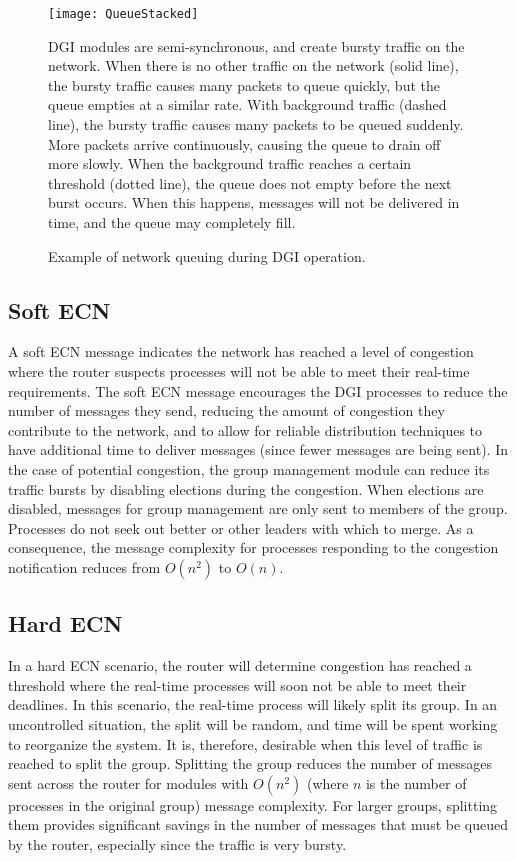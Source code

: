\begin{figure}
\centering
\texttt{[image: QueueStacked]}
\caption{
Example of network queuing during \ac{DGI} operation.
}
\ac{DGI} modules are semi-synchronous, and create bursty traffic on the network.
When there is no other traffic on the network (solid line), the bursty traffic causes many packets to queue quickly, but the queue empties at a similar rate.
With background traffic (dashed line), the bursty traffic causes many packets to be queued suddenly. More packets arrive continuously, causing the queue to drain off more slowly.
When the background traffic reaches a certain threshold (dotted line), the queue does not empty before the next burst occurs. When this happens, messages will not be delivered in time, and the queue may completely fill.
\label{fig:queue-types}
\end{figure}

\subsection{Soft \ac{ECN}}

A soft \ac{ECN} message indicates the network has reached a level of congestion where the router suspects processes will not be able to meet their real-time requirements.
The soft \ac{ECN} message encourages the \ac{DGI} processes to reduce the number of messages they send, reducing the amount of congestion they contribute to the network, and to allow for reliable distribution techniques to have additional time to deliver messages (since fewer messages are being sent).
In the case of potential congestion, the group management module can reduce its traffic bursts by disabling elections during the congestion.
When elections are disabled, messages for group management are only sent to members of the group.
Processes do not seek out better or other leaders with which to merge.
As a consequence, the message complexity for processes responding to the congestion notification reduces from $O(n^2)$ to $O(n)$.

\subsection{Hard \ac{ECN}}

In a hard \ac{ECN} scenario, the router will determine congestion has reached a threshold where the real-time processes will soon not be able to meet their deadlines.
In this scenario, the real-time process will likely split its group.
In an uncontrolled situation, the split will be random, and time will be spent working to reorganize the system.
It is, therefore, desirable when this level of traffic is reached to split the group.
Splitting the group reduces the number of messages sent across the router for modules with $O(n^2)$ (where $n$ is the number of processes in the original group) message complexity.
For larger groups, splitting them provides significant savings in the number of messages that must be queued by the router, especially since the traffic is very bursty.

